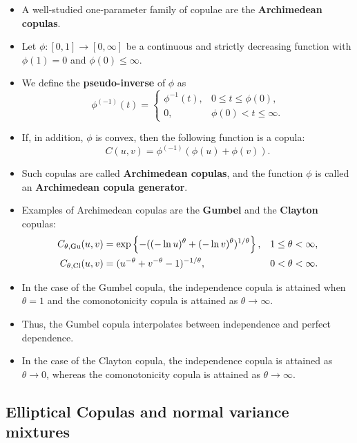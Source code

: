 \begin{itemize}
\item A well-studied one-parameter family of copulae are the {\bf
    Archimedean copulas}. 
\item Let $\phi:[0,1]\rightarrow[0,\infty]$ be a
  continuous and strictly decreasing function with $\phi(1)=0$ and
  $\phi(0)\leq\infty$.
\item  We define the {\bf pseudo-inverse} of $\phi$ as 
  \begin{equation*}
    \phi^{(-1)}(t)=
    \begin{cases}
      \phi^{-1}(t), &0\leq t\leq \phi(0),\\
      0, &\phi(0)<t\leq\infty.
    \end{cases}
  \end{equation*}
\item If, in addition, $\phi$ is convex, then the following function
  is a copula: 
  \begin{equation*}
    C(u,v)=\phi^{(-1)}(\phi(u)+\phi(v)).
  \end{equation*}
  \vspace*{-\baselineskip}
\item Such copulas are called {\bf Archimedean copulas}, and the
  function $\phi$ is called an {\bf Archimedean copula generator}. 
\item Examples of Archimedean copulas are the {\bf Gumbel} and the
  {\bf Clayton} copulas:
  \begin{align*}
    C_{\theta,{\rm Gu}}(u,v) &= \exp\left\{-((-\ln u)^\theta + (-\ln
                               v)^\theta)^{1/\theta}\right\},& 1\leq \theta<\infty,\\
    C_{\theta,{\rm Cl}}(u,v)&= (u^{-\theta} + v^{-\theta}
                              -1)^{-1/\theta}, & 0<\theta<\infty. 
  \end{align*}
\item In the case of the Gumbel copula, the independence copula is 
  attained when $\theta=1$ and the comonotonicity copula is attained
  as $\theta\rightarrow\infty$. 
\item Thus, the Gumbel copula interpolates between independence and
  perfect dependence.  
\item In the case of the Clayton copula, the independence copula is
  attained as $\theta\rightarrow 0$, whereas the comonotonicity
  copula is attained as $\theta\rightarrow\infty$. 
\end{itemize}

\subsection{Elliptical Copulas and normal variance mixtures}
\label{subsec:elliptical-copulae}


